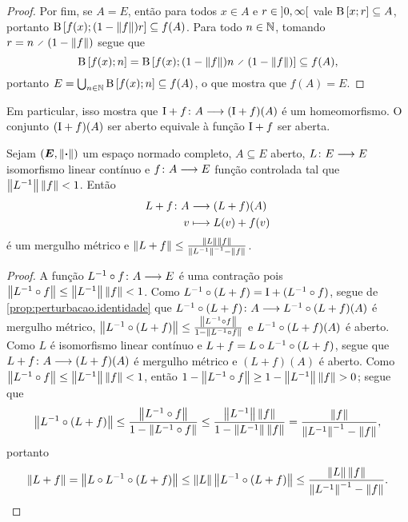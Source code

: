 \begin{proof}
Por fim, se $A=E$, então para todos $x \in A$ e $r \in \left]{0},{\infty}\right[$ vale $\mathrm{B}\left[{x};{r}\right] \subseteq A$, portanto $\mathrm{B}\left[{f(x)};{(1-\left\Vert{f}\right\Vert)r}\right] \subseteq f(A)$. Para todo $n \in \mathbb{N}$, tomando $r = n \div (1-\distor{f})$ segue que
	\begin{equation*}
	\bolafec{f(x)}{n} = \bolafec{f(x)}{(1-\distor{f})n \div (1-\distor{f})} \subseteq f(A),
	\end{equation*}
portanto $E = \bigcup_{n \in \mathbb{N}} \mathrm{B}\left[{f(x)};{n}\right] \subseteq f(A)$, o que mostra que $f(A)=E$.
\end{proof}

Em particular, isso mostra que ${\mathrm{I}+f}\colon {A} \longrightarrow {(\mathrm{I}+f)(A)}$ é um homeomorfismo. O conjunto $(\mathrm{I} + f)(A)$ ser aberto equivale à função $\mathrm{I} + f$ ser aberta.

\begin{proposition}
\label{prop:perturbacao.linear}
Sejam $(\bm E,\left\Vert{\bm{\cdot}}\right\Vert)$ um espaço normado completo, $A \subseteq E$ aberto, ${L}\colon {E} \longrightarrow {E}$ isomorfismo linear contínuo e ${f}\colon {A} \longrightarrow {E}$ função controlada tal que $\left\Vert{L^{-1}}\right\Vert\left\Vert{f}\right\Vert < 1$. Então
	\begin{align*}
	{L+f}\colon {A} &\longrightarrow {(L+f)(A)} \\{v} &\longmapsto L(v)+f(v)
	\end{align*}
é um mergulho métrico e $\left\Vert{L+f}\right\Vert \leq \frac{\left\Vert{L}\right\Vert\left\Vert{f}\right\Vert}{\left\Vert{L^{-1}}\right\Vert^{-1}-\left\Vert{f}\right\Vert}$.
\end{proposition}
\begin{proof}
A função ${L^{-1} \circ f}\colon {A} \longrightarrow {E}$ é uma contração pois $\left\Vert{L^{-1}\circ f}\right\Vert \leq \left\Vert{L^{-1}}\right\Vert\left\Vert{f}\right\Vert < 1$. Como $L^{-1} \circ (L+f) = \mathrm{I} + (L^{-1} \circ f)$, segue de \ref{prop:perturbacao.identidade} que ${L^{-1} \circ (L+f)}\colon {A} \longrightarrow {L^{-1}\circ (L+f)(A)}$ é mergulho métrico, $\left\Vert{L^{-1}\circ (L+f)}\right\Vert \leq \frac{\left\Vert{L^{-1}\circ f}\right\Vert}{1-\left\Vert{L^{-1}\circ f}\right\Vert}$ e $L^{-1} \circ (L+f)(A)$ é aberto. Como $L$ é isomorfismo linear contínuo e $L+f = L \circ L^{-1} \circ (L+f)$, segue que ${L+f}\colon {A} \longrightarrow {(L+f)(A)}$ é mergulho métrico e $(L+f)(A)$ é aberto. Como $\left\Vert{L^{-1}\circ f}\right\Vert \leq \left\Vert{L^{-1}}\right\Vert\left\Vert{f}\right\Vert < 1$, então $1-\left\Vert{L^{-1}\circ f}\right\Vert \geq 1-\left\Vert{L^{-1}}\right\Vert\left\Vert{f}\right\Vert > 0$; segue que
	\begin{equation*}
	\left\Vert{L^{-1}\circ (L+f)}\right\Vert \leq \frac{\left\Vert{L^{-1}\circ f}\right\Vert}{1-\left\Vert{L^{-1}\circ f}\right\Vert}
		\leq \frac{\left\Vert{L^{-1}}\right\Vert\left\Vert{f}\right\Vert}{1-\left\Vert{L^{-1}}\right\Vert\left\Vert{f}\right\Vert}
		= \frac{\left\Vert{f}\right\Vert}{\left\Vert{L^{-1}}\right\Vert^{-1}-\left\Vert{f}\right\Vert},
	\end{equation*}
portanto
	\begin{equation*}
	\left\Vert{L+f}\right\Vert = \left\Vert{L \circ L^{-1}\circ (L+f)}\right\Vert
		\leq \left\Vert{L}\right\Vert\left\Vert{L^{-1}\circ (L+f)}\right\Vert
		\leq \frac{\left\Vert{L}\right\Vert\left\Vert{f}\right\Vert}{\left\Vert{L^{-1}}\right\Vert^{-1}-\left\Vert{f}\right\Vert}.
		\qedhere
	\end{equation*}
\end{proof}



